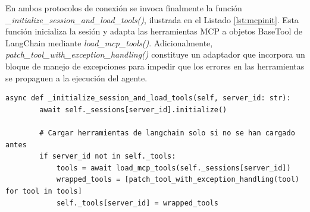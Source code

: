 En ambos protocolos de conexión se invoca finalmente la función \textit{\_initialize\_session\_and\_load\_tools()}, ilustrada en el Listado \ref{lst:mcpinit}. Esta función inicializa la sesión y adapta las herramientas MCP a objetos BaseTool de LangChain mediante \textit{load\_mcp\_tools()}. Adicionalmente, \textit{patch\_tool\_with\_exception\_handling()} constituye un adaptador que incorpora un bloque de manejo de excepciones para impedir que los errores en las herramientas se propaguen a la ejecución del agente.

\begin{lstlisting}[caption={mcp\_multi\_client.py: función \textit{\_initialize\_session\_and\_load\_tools en cliente MCP}},label={lst:mcpinit}]
    async def _initialize_session_and_load_tools(self, server_id: str):
        await self._sessions[server_id].initialize()

        # Cargar herramientas de langchain solo si no se han cargado antes
        if server_id not in self._tools:
            tools = await load_mcp_tools(self._sessions[server_id])
            wrapped_tools = [patch_tool_with_exception_handling(tool) for tool in tools]
            self._tools[server_id] = wrapped_tools
\end{lstlisting}





